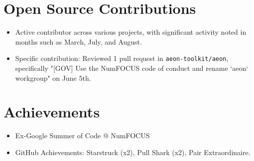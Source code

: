 \documentclass{article}
\begin{document}
\section*{Open Source Contributions}
\begin{itemize}
    \item Active contributor across various projects, with significant activity noted in months such as March, July, and August.
    \item Specific contribution: Reviewed 1 pull request in \texttt{aeon-toolkit/aeon}, specifically "[GOV] Use the NumFOCUS code of conduct and rename `aeon` workgroup" on June 5th.
\end{itemize}

\section*{Achievements}
\begin{itemize}
    \item Ex-Google Summer of Code @ NumFOCUS
    \item GitHub Achievements: Starstruck (x2), Pull Shark (x2), Pair Extraordinaire.
\end{itemize}
\end{document}
